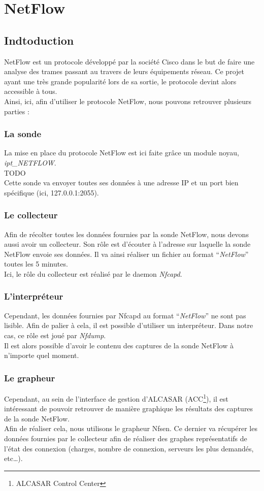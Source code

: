 \section{NetFlow}
\subsection{Indtoduction}
NetFlow est un protocole développé par la société Cisco dans le but de faire une analyse des trames passant au travers de leurs équipements réseau. Ce projet ayant une très grande popularité lors de sa sortie, le protocole devint alors accessible à tous.\\
Ainsi, ici, afin d'utiliser le protocole NetFlow, nous pouvons retrouver plusieurs parties :
\subsubsection{La sonde}
La mise en place du protocole NetFlow est ici faite grâce un module noyau, \textit{ipt\_NETFLOW}.\\
TODO\\
Cette sonde va envoyer toutes ses données à une adresse IP et un port bien spécifique (ici, 127.0.0.1:2055).
\subsubsection{Le collecteur}
Afin de récolter toutes les données fournies par la sonde NetFlow, nous devons aussi avoir un collecteur. Son rôle est d'écouter à l'adresse sur laquelle la sonde NetFlow envoie ses données. Il va ainsi réaliser un fichier au format \enquote{\textit{NetFlow}} toutes les 5 minutes.\\
Ici, le rôle du collecteur est réalisé par le daemon \textit{Nfcapd}.
\subsubsection{L'interpréteur}
Cependant, les données fournies par Nfcapd au format \enquote{\textit{NetFlow}} ne sont pas lisible. Afin de palier à cela, il est possible d'utiliser un interpréteur. Dans notre cas, ce rôle est joué par \textit{Nfdump}.\\
Il est alors possible d'avoir le contenu des captures de la sonde NetFlow à n'importe quel moment.
\subsubsection{Le grapheur}
Cependant, au sein de l'interface de gestion d'ALCASAR (ACC\footnote{ALCASAR Control Center}), il est intéressant de pouvoir retrouver de manière graphique les résultats des captures de la sonde NetFlow.\\
Afin de réaliser cela, nous utilisons le grapheur Nfsen. Ce dernier va récupérer les données fournies par le collecteur afin de réaliser des graphes représentatifs de l'état des connexion (charges, nombre de connexion, serveurs les plus demandés, etc\ldots).

